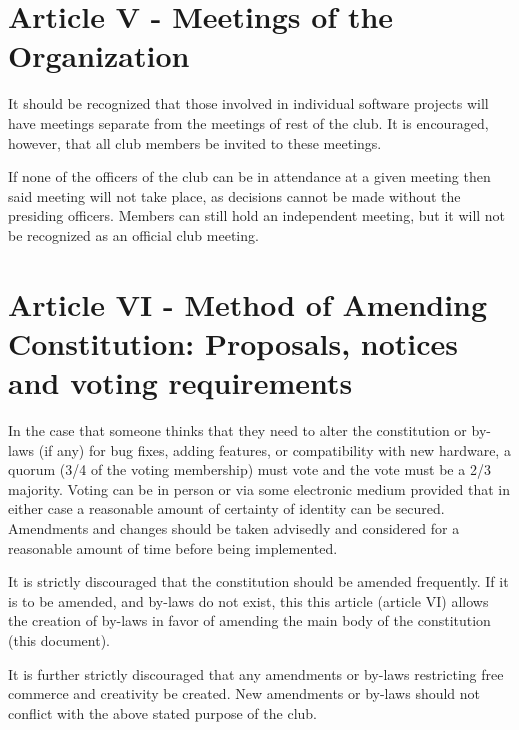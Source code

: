 \documentclass{article}
\begin{document}
	\section{Article V - Meetings of the Organization}


	It should be recognized that those involved in individual software projects
	will have meetings separate from the meetings of rest of the club. It is
	encouraged, however, that all club members be invited to these meetings.

	If none of the officers of the club can be in attendance at a given meeting
	then said meeting will not take place, as decisions cannot be made without
	the presiding officers. Members can still hold an independent meeting, but
	it will not be recognized as an official club meeting.

	\section{Article VI - Method of Amending Constitution: Proposals, notices
	and voting requirements}

	In the case that someone thinks that they need to alter the constitution or
	by-laws (if any) for bug fixes, adding features, or compatibility with new
	hardware, a quorum (3/4 of the voting membership) must vote and the vote
	must be a 2/3 majority. Voting can be in person or via some electronic
	medium provided that in either case a reasonable amount of certainty of
	identity can be secured. Amendments and changes should be taken advisedly
	and considered for a reasonable amount of time before being implemented.

	It is strictly discouraged that the constitution should be amended
	frequently. If it is to be amended, and by-laws do not exist, this this
	article (article VI) allows the creation of by-laws in favor of amending
	the main body of the constitution (this document).

	It is further strictly discouraged that any amendments or by-laws
	restricting free commerce and creativity be created. New amendments or
	by-laws should not conflict with the above stated purpose of the club.
\end{document}
